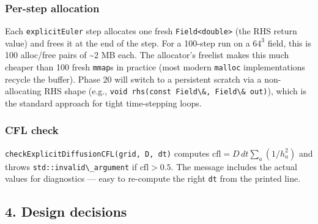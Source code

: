 \subsubsection{Per-step allocation}\label{per-step-allocation}

Each \passthrough{\lstinline!explicitEuler!} step allocates one fresh
\passthrough{\lstinline!Field<double>!} (the RHS return value) and frees
it at the end of the step. For a 100-step run on a \(64^3\) field, this
is 100 alloc/free pairs of \textasciitilde2 MB each. The allocator's
freelist makes this much cheaper than 100 fresh
\passthrough{\lstinline!mmap!}s in practice (most modern
\passthrough{\lstinline!malloc!} implementations recycle the buffer).
Phase 20 will switch to a persistent scratch via a non-allocating RHS
shape (e.g.,
\passthrough{\lstinline!void rhs(const Field\&, Field\& out)!}), which
is the standard approach for tight time-stepping loops.

\subsubsection{CFL check}\label{cfl-check}

\passthrough{\lstinline!checkExplicitDiffusionCFL(grid, D, dt)!}
computes \(\mathrm{cfl} = D\,dt \sum_a (1/h_a^2)\) and throws
\passthrough{\lstinline!std::invalid\_argument!} if
\(\mathrm{cfl} > 0.5\). The message includes the actual values for
diagnostics --- easy to re-compute the right
\passthrough{\lstinline!dt!} from the printed line.

\subsection{4. Design decisions}\label{design-decisions}

